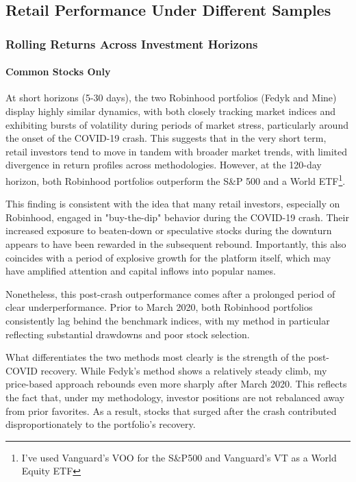 \subsection{Retail Performance Under Different Samples}\label{diff_samples}
\subsubsection{Rolling Returns Across Investment Horizons}
\paragraph{Common Stocks Only}\label{fedyk_paper_returns}
At short horizons (5-30 days), the two Robinhood portfolios (Fedyk and Mine) display highly similar dynamics, with both closely tracking market indices and exhibiting bursts of volatility during periods of market stress, particularly around the onset of the COVID-19 crash. 
This suggests that in the very short term, retail investors tend to move in tandem with broader market trends, with limited divergence in return profiles across methodologies.
However, at the 120-day horizon, both Robinhood portfolios outperform the S\&P 500 and a World ETF\footnote{I've used Vanguard's VOO for the S\&P500 and Vanguard's VT as a World Equity ETF}. 

This finding is consistent with the idea that many retail investors, especially on Robinhood, engaged in "buy-the-dip" behavior during the COVID-19 crash. 
Their increased exposure to beaten-down or speculative stocks during the downturn appears to have been rewarded in the subsequent rebound. 
Importantly, this also coincides with a period of explosive growth for the platform itself, which may have amplified attention and capital inflows into popular names.

Nonetheless, this post-crash outperformance comes after a prolonged period of clear underperformance. 
Prior to March 2020, both Robinhood portfolios consistently lag behind the benchmark indices, with my method in particular reflecting substantial drawdowns and poor stock selection.

What differentiates the two methods most clearly is the strength of the post-COVID recovery. 
While Fedyk's method shows a relatively steady climb, my price-based approach rebounds even more sharply after March 2020. 
This reflects the fact that, under my methodology, investor positions are not rebalanced away from prior favorites. 
As a result, stocks that surged after the crash contributed disproportionately to the portfolio's recovery. 

